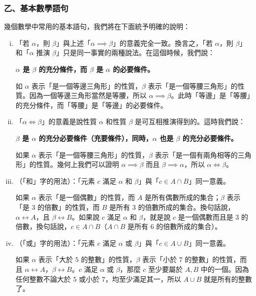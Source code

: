 \subsubsection*{乙、基本數學語句}\label{subsec:2-4-b}

幾個數學中常用的基本語句，我們將在下面統予明確的說明：

\begin{enumerate}[(i)]
  \item 「若 $\alpha$，則 $\beta$」與上述「$\alpha \implies \beta$」的意義完全一致。換言之，「若 $\alpha$，則 $\beta$」和「$\alpha$ 推演 $\beta$」只是同一事實的兩種說法。在這個時候，我們說：
  \begin{center}
    \textbf{$\alpha$ 是 $\beta$ 的充分條件，而 $\beta$ 是 $\alpha$ 的必要條件。}
  \end{center}
  \begin{example}\label{ex:2-4-3}
  如 $\alpha$ 表示「是一個等邊三角形」的性質，$\beta$ 表示「是一個等腰三角形」的性質。因為一個等邊三角形當然是等腰，所以 $\alpha \implies \beta$。此時「等邊」是「等腰」的充分條件，而「等腰」是「等邊」的必要條件。
  \end{example}

  \item 「$\alpha \iff \beta$」的意義是說性質 $\alpha$ 和性質 $\beta$ 是可互相推演得到的。這時我們說：
  \begin{center}
    \textbf{$\beta$ 是 $\alpha$ 的充分必要條件（充要條件），同時，$\alpha$ 也是 $\beta$ 的充分必要條件。}
  \end{center}
  \begin{example}\label{ex:2-4-4}
  如果 $\alpha$ 表示「是一個等腰三角形」的性質，$\beta$ 表示「是一個有兩角相等的三角形」的性質。幾何上我們可以證明 $\alpha \implies \beta$ 而且 $\beta \implies \alpha$，所以 $\alpha \iff \beta$。
  \end{example}

  \item （「和」字的用法）：「元素 $c$ 滿足 $\alpha$ 和 $\beta$」與「$c \in A \cap B$」同一意義。
  \begin{example}\label{ex:2-4-5}
  如果 $\alpha$ 表示「是一個偶數」的性質，而 $A$ 是所有偶數所成的集合；$\beta$ 表示「是 $3$ 的倍數」的性質，而 $B$ 是所有 $3$ 的倍數所成的集合。換句話說，$\alpha \longleftrightarrow A$，且 $\beta \longleftrightarrow B$。如果說 $c$ 滿足 $\alpha$ 和 $\beta$，就是說 $c$ 是一個偶數而且是 $3$ 的倍數，換句話說，$c \in A \cap B$（$A \cap B$ 是所有 $6$ 的倍數所成的集合）。
  \end{example}

  \item （「或」字的用法）：「元素 $c$ 滿足 $\alpha$ 或 $\beta$」與「$c \in A \cup B$」同一意義。
  \begin{example}\label{ex:2-4-6}
  如果 $\alpha$ 表示「大於 $5$ 的整數」的性質，$\beta$ 表示「小於 $7$ 的整數」的性質，而且 $\alpha \longleftrightarrow A$，$\beta \longleftrightarrow B$。$c$ 滿足 $\alpha$ 或 $\beta$，那麼 $c$ 至少要屬於 $A, B$ 中的一個。因為任何整數不論大於 $5$ 或小於 $7$，均至少滿足其一，所以 $A \cup B$ 就是所有的整數了。
  \end{example}
\end{enumerate}

